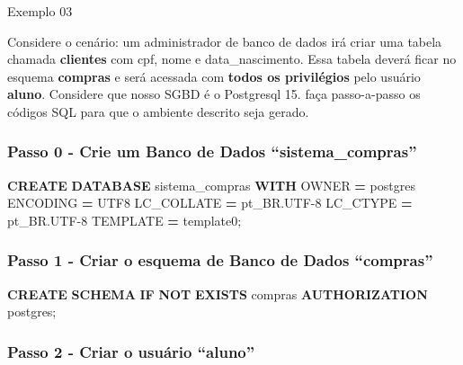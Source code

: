 \documentclass[
]{book}
\newenvironment{Shaded}{\begin{snugshade}}{\end{snugshade}}
\newcommand{\ControlFlowTok}[1]{\textcolor[rgb]{0.13,0.29,0.53}{\textbf{#1}}}
\newcommand{\KeywordTok}[1]{\textcolor[rgb]{0.13,0.29,0.53}{\textbf{#1}}}
\newcommand{\NormalTok}[1]{#1}
\newcommand{\OperatorTok}[1]{\textcolor[rgb]{0.81,0.36,0.00}{\textbf{#1}}}
\newcommand{\StringTok}[1]{\textcolor[rgb]{0.31,0.60,0.02}{#1}}
\begin{document}
Exemplo 03

Considere o cenário: um administrador de banco de dados irá criar uma tabela chamada \textbf{clientes} com cpf, nome e data\_nascimento. Essa tabela deverá ficar no esquema \textbf{compras} e será acessada com \textbf{todos os privilégios} pelo usuário \textbf{aluno}. Considere que nosso SGBD é o Postgresql 15. faça passo-a-passo os códigos SQL para que o ambiente descrito seja gerado.

\subsubsection{Passo 0 - Crie um Banco de Dados ``sistema\_compras''}\label{passo-0---crie-um-banco-de-dados-sistema_compras}

\begin{Shaded}
\begin{Highlighting}[]
\KeywordTok{CREATE} \KeywordTok{DATABASE}\NormalTok{ sistema\_compras}
    \KeywordTok{WITH}\NormalTok{ OWNER }\OperatorTok{=}\NormalTok{ postgres}
\NormalTok{    ENCODING }\OperatorTok{=} \StringTok{\textquotesingle{}UTF8\textquotesingle{}}
\NormalTok{    LC\_COLLATE }\OperatorTok{=} \StringTok{\textquotesingle{}pt\_BR.UTF{-}8\textquotesingle{}}
\NormalTok{    LC\_CTYPE }\OperatorTok{=} \StringTok{\textquotesingle{}pt\_BR.UTF{-}8\textquotesingle{}}
\NormalTok{    TEMPLATE }\OperatorTok{=}\NormalTok{ template0;}
\end{Highlighting}
\end{Shaded}

\subsubsection{Passo 1 - Criar o esquema de Banco de Dados ``compras''}\label{passo-1---criar-o-esquema-de-banco-de-dados-compras-1}

\begin{Shaded}
\begin{Highlighting}[]
\KeywordTok{CREATE} \KeywordTok{SCHEMA} \ControlFlowTok{IF} \KeywordTok{NOT} \KeywordTok{EXISTS}\NormalTok{ compras }\KeywordTok{AUTHORIZATION}\NormalTok{ postgres;}
\end{Highlighting}
\end{Shaded}

\subsubsection{Passo 2 - Criar o usuário ``aluno''}\label{passo-2---criar-o-usuuxe1rio-aluno-1}
\end{document}
